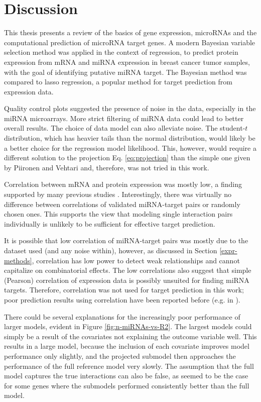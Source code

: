 
\section{Discussion}

This thesis presents a review of the basics of gene expression, microRNAs and
the computational prediction of microRNA target genes. A modern Bayesian
variable selection method was applied in the context of regression, to predict
protein expression from mRNA and miRNA expression in breast cancer tumor
samples, with the goal of identifying putative miRNA target. The Bayesian
method was compared to lasso regression, a popular method for target
prediction from expression data.

Quality control plots suggested the presence of noise in the data, especially
in the miRNA microarrays. More strict filtering of miRNA data could lead to
better overall results. The choice of data model can also alleviate noise. The
student-$t$ distribution, which has heavier tails than the normal
distribution, would likely be a better choice for the regression model
likelihood. This, however, would require a different solution to the
projection Eq. \eqref{eq:projection} than the simple one given by Piironen
and Vehtari \citep{Piironen2015} and, therefore, was not tried in this work.

Correlation between mRNA and protein expression was mostly low, a finding
supported by many previous studies \citep{Payne2015}. Interestingly, there was
virtually no difference between correlations of validated miRNA-target pairs
or randomly chosen ones. This supports the view that modeling single
interaction pairs individually is unlikely to be sufficient for effective target
prediction.

It is possible that low correlation of miRNA-target pairs was mostly due to the
dataset used (and any noise within), however, as discussed in Section \ref{expr-methods},
correlation has low power to detect weak relationships and
cannot capitalize on combinatorial effects. The low correlations also suggest
that simple (Pearson) correlation of expression data is possibly unsuited for
finding miRNA targets.  Therefore, correlation was not used for target
prediction in this work; poor prediction results using correlation have been
reported before (e.g. in
\citep{Muniategui2012}).

There could be several explanations for the increasingly poor performance of
larger models, evident in Figure \ref{fig:n-miRNAs-vs-R2}. The largest models
could simply be a result of the covariates not explaining the outcome variable
well. This results in a large model, because the inclusion of each covariate
improves model performance only slightly, and the projected submodel then
approaches the performance of the full reference model very slowly. The
assumption that the full model captures the true interactions can also be
false, as seemed to be the case for some genes where the submodels performed 
consistently better than the full model.

